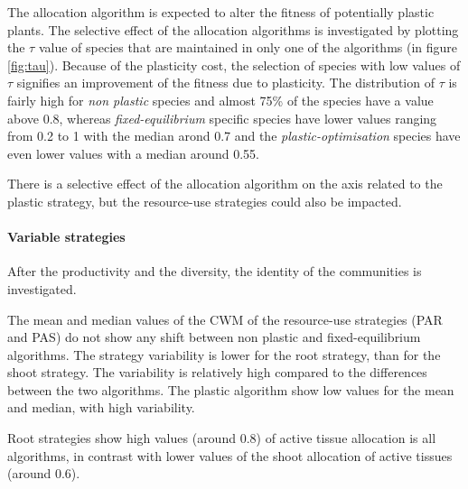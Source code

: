 The allocation algorithm is expected to alter the fitness of potentially plastic plants. The selective effect of the allocation algorithms is investigated by plotting the $\tau$ value of species that are maintained in only one of the algorithms (in figure \ref{fig:tau}). Because of the plasticity cost, the selection of species with low values of $\tau$ signifies an improvement of the fitness due to plasticity. The distribution of $\tau$ is fairly high for \textit{non plastic} species and almost 75\% of the species have a value above 0.8, whereas \textit{fixed-equilibrium} specific species have lower values ranging from 0.2 to 1 with the median arond 0.7 and the \textit{plastic-optimisation} species have even lower values with a median around 0.55.



There is a selective effect of the allocation algorithm on the axis related to the plastic strategy, but the resource-use strategies could also be impacted.


\paragraph{Variable strategies}

After the productivity and the diversity, the identity of the communities is investigated.

The mean and median values of the CWM of the resource-use strategies (PAR and PAS) do not show any shift between non plastic and fixed-equilibrium algorithms. The strategy variability is lower for the root strategy, than for the shoot strategy. The variability is relatively high compared to the differences between the two algorithms. The plastic algorithm show low values for the mean and median, with high variability.

Root strategies show high values (around 0.8) of active tissue allocation is all algorithms, in contrast with lower values of the shoot allocation of active tissues (around 0.6).

